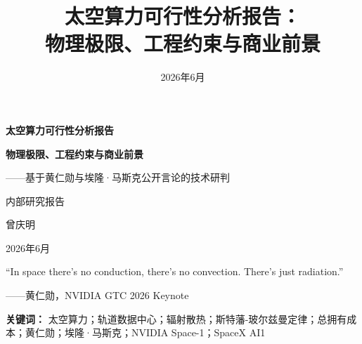 \documentclass[12pt,a4paper]{article}
\title{太空算力可行性分析报告：\\物理极限、工程约束与商业前景}
\author{}
\date{2026年6月}
\begin{document}
\begin{titlepage}
    \centering
    \vspace*{2cm}

    {\Huge\bfseries 太空算力可行性分析报告\par}
    \vspace{0.5cm}
    {\Large\bfseries 物理极限、工程约束与商业前景\par}
    \vspace{0.3cm}
    {\large ——基于黄仁勋与埃隆·马斯克公开言论的技术研判\par}

    \vspace{0.8cm}

    {\Large 内部研究报告\par}

    \vspace{2cm}

    {\Large 曾庆明\par}

    \vspace{2cm}

    {\large 2026年6月\par}

    \vfill

    \begin{minipage}{0.85\textwidth}
        \small\itshape
        \begin{flushright}
        ``In space there's no conduction, there's no convection. There's just radiation.''

        \vspace{0.3em}
        \normalfont\small
        ——黄仁勋，NVIDIA GTC 2026 Keynote
        \end{flushright}
    \end{minipage}

    \vspace{1cm}

\renewcommand{\thefootnote}{\arabic{footnote}}
\end{titlepage}

\newpage

\begin{abstract}

\end{abstract}

\newpage

\vspace{1cm}
\textbf{关键词：} 太空算力；轨道数据中心；辐射散热；斯特藩-玻尔兹曼定律；总拥有成本；黄仁勋；埃隆·马斯克；NVIDIA Space-1；SpaceX AI1

\tableofcontents
\newpage








\printbibliography
\end{document}
